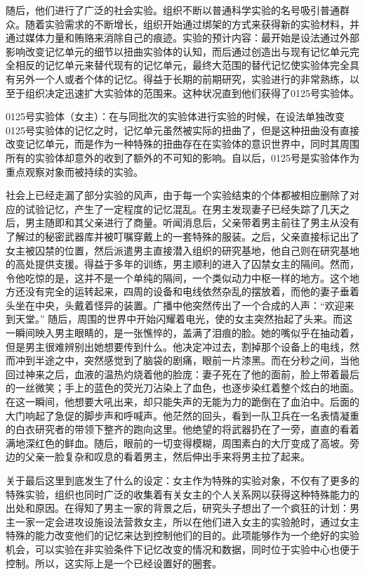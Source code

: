 \documentclass[12pt, a4paper]{article}
\begin{document}
        随后，他们进行了广泛的社会实验。组织不断以普通科学实验的名号吸引普通群众。随着实验需求的不断增长，组织开始通过绑架的方式来获得新的实验材料，并通过媒体力量和贿赂来消除自己的痕迹。实验的预计内容：最开始是设法通过外部影响改变记忆单元的细节以扭曲实验体的认知，而后通过创造出与现有记忆单元完全相反的记忆单元来替代现有的记忆单元，最终大范围的替代记忆使实验体完全具有另外一个人或者个体的记忆。得益于长期的前期研究，实验进行的非常熟练，以至于组织决定迅速扩大实验体的范围来。这种状况直到他们获得了0125号实验体。 

        0125号实验体（女主）：在与同批次的实验体进行实验的时候，在设法单独改变0125号实验体的记忆之时，记忆单元虽然被实际的扭曲了，但是这种扭曲没有直接改变记忆单元，而是作为一种特殊的扭曲存在在实验体的意识世界中，同时其周围所有的实验体却意外的收到了额外的不可知的影响。自以后，0125号是实验体作为重点观察对象而被持续的实验。

        社会上已经走漏了部分实验的风声，由于每一个实验结束的个体都被相应删除了对应的试验记忆，产生了一定程度的记忆混乱。在男主发现妻子已经失踪了几天之后，男主随即和其父亲进行了商量。听闻消息后，父亲带着男主前往了男主从没有了解过的秘密武器库并被叮嘱穿戴上的一套特殊的服装。之后，父亲直接标记出了女主被囚禁的位置，然后派遣男主直接潜入组织的研究基地，他自己则在研究基地的高处提供支援。得益于多年的训练，男主顺利的进入了囚禁女主的隔间。然而，令他吃惊的是，这并不是一个单纯的隔间，一个类似动力中枢一样的地方。这个地方还没有完全的运转起来，四周的设备和电线依然杂乱的摆放着，而他的妻子垂着头坐在中央，头戴着怪异的装置。广播中他突然传出了一个合成的人声：“欢迎来到天堂。” 随后，周围的世界中开始闪耀着电光，使的女主突然抬起了头来。而这一瞬间映入男主眼睛的，是一张憔悴的，盖满了泪痕的脸。她的嘴似乎在抽动着，但是男主很难辨别出她想要传到什么。他决定冲过去，割掉那个设备上的电线，然而冲到半途之中，突然感觉到了脑袋的剧痛，眼前一片漆黑。而在分秒之间，当他回过神来之后，血液的温热灼烧着他的脸庞：妻子死在了他的面前，脸上带着最后的一丝微笑；手上的蓝色的荧光刀沾染上了血色，也逐步染红着整个炫白的地面。在这一瞬间，他想要大吼出来，却只能失声的无能为力的跪倒在了血泊中。后面的大门响起了急促的脚步声和呼喊声。他茫然的回头，看到一队卫兵在一名表情凝重的白衣研究者的带领下整齐的跑向这里。他绝望的将武器扔在了一旁，直直的看着满地深红色的鲜血。随后，眼前的一切变得模糊，周围素白的大厅变成了高坡。旁边的父亲一脸复杂和叹息的看着男主，然后伸出手来将男主拉了起来。
        
        关于最后这里到底发生了什么的设定：女主作为特殊的实验对象，不仅有了更多的特殊实验，组织也同时广泛的收集着有关女主的个人关系网以获得这种特殊能力的出处和原因。在得知了男主一家的背景之后，研究头子想出了一个疯狂的计划：男主一家一定会进攻设施设法营救女主，所以在他们进入女主的实验舱时，通过女主特殊的能力改变他们的记忆来达到控制他们的目的。此项能够作为一个绝好的实验机会，可以实验在非实验条件下记忆改变的情况和数据，同时位于实验中心也便于控制。所以，这实际上是一个已经设置好的圈套。
\end{document}

